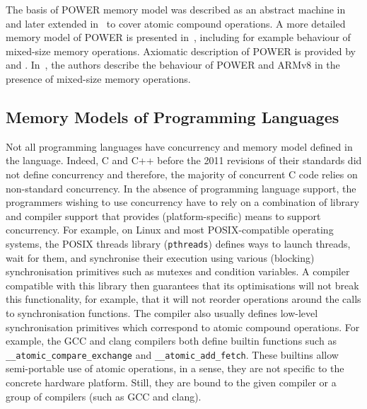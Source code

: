The basis of POWER memory model was described as an abstract machine
in~ and later extended in~ to cover atomic
compound operations.
A more detailed memory model of POWER is presented in~,
including for example behaviour of mixed-size memory operations.
Axiomatic description of POWER is provided by~ and
.
In~, the authors describe the behaviour of POWER and ARMv8 in
the presence of mixed-size memory operations.

\subsection{Memory Models of Programming Languages\protect\mnotemark}%

Not all programming languages have concurrency and memory model defined in the
language.
Indeed, C and C++ before the 2011 revisions of their standards did
not define concurrency and therefore, the majority of concurrent C code relies on non-standard concurrency.
In the absence of programming language support, the programmers wishing to use
concurrency have to rely on a combination of library and compiler support that
provides (platform-specific) means to support concurrency.
For example, on Linux and most POSIX-compatible operating systems, the POSIX
threads library (\texttt{pthreads}) defines ways to launch threads, wait for
them, and synchronise their execution using various (blocking) synchronisation
primitives such as mutexes and condition variables.
A compiler compatible with this library then guarantees that its optimisations
will not break this functionality, for example, that it will not reorder
operations around the calls to synchronisation functions.
The compiler also usually defines low-level synchronisation primitives which correspond to atomic compound operations.
For example, the GCC and clang compilers both define builtin functions such as \texttt{\_\_atomic\_compare\_exchange} and \texttt{\_\_atomic\_add\_fetch}.
These builtins allow semi-portable use of atomic operations, in a sense, they are not specific to the concrete hardware platform.
Still, they are bound to the given compiler or a group of compilers (such as GCC and clang).

